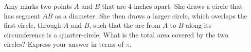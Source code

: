 Amy marks two points $A$ and $B$ that are $4$ inches apart. She draws a circle that has segment $AB$ as a diameter. She then draws a larger circle, which overlaps the first circle, through $A$ and $B$, such that the arc from $A$ to $B$ along its circumference is a quarter-circle. What is the total area covered by the two circles? Express your answer in terms of $\pi$.
